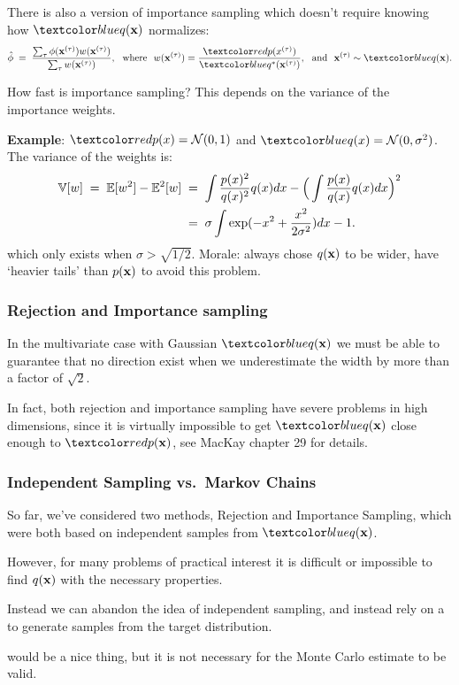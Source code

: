 \begin{frame}
There is also a version of importance sampling which doesn't require knowing
how $\Blue{q({\bfx})}$ normalizes:
\[
\hat\phi\;=\;\frac{\sum_\tau\phi(\bfx^{(\tau)})w(\bfx^{(\tau)})}{\sum_\tau w(\bfx^{(\tau)})}, \text{\ \ where\ \ }w(\bfx^{(\tau)})=\frac{\Red{p(x^{(\tau)})}}{\Blue{q^*(\bfx^{(\tau)})}}, \text{\ \ and\ \ }\bfx^{(\tau)}\sim\Blue{q(\bfx)}.
\]

How fast is importance sampling? This depends on the variance of the importance
weights.

{\bf Example}: $\Red{p(x)=\N(0,1)}$ and $\Blue{q(x)=\N(0,\sigma^2)}$. The
variance of the weights is:
\[
\begin{split}
\mathbb{V}[w]\;=\;\mathbb{E}[w^2]-\mathbb{E}^2[w]\;&=\;\int\frac{p(x)^2}{q(x)^2}q(x)dx-\Big(\int\frac{p(x)}{q(x)}q(x)dx\Big)^2\\
&=\;\sigma\int\exp(-x^2+\frac{x^2}{2\sigma^2})dx-1.
\end{split}
\]
which only exists when $\sigma>\sqrt{1/2}$. Morale: always chose $q(\mathbf x)$ to
be wider, have `heavier tails' than $p(\mathbf x)$ to avoid this problem.
\end{frame}

\begin{frame}
\frametitle{Rejection and Importance sampling}

In the multivariate case with Gaussian $\Blue{q(\bfx)}$ we must be able to
guarantee that no direction exist when we underestimate the width by more than
a factor of $\sqrt{2}$.

In fact, both rejection and importance sampling have severe problems in high
dimensions, since it is virtually impossible to get $\Blue{q(\bfx)}$ close
enough to $\Red{p(\bfx)}$, see MacKay chapter 29 for details.
\end{frame}

\begin{frame}
\frametitle{Independent Sampling vs.~Markov Chains}

So far, we've considered two methods, Rejection and Importance
Sampling, which were both based on independent samples from $\Blue{q(\bfx)}$.

However, for many problems of practical interest it is difficult or
impossible to find $q(\mathbf x)$ with the necessary properties.

Instead we can abandon the idea of independent sampling, and instead
rely on a  to generate  samples
from the target distribution.

 would be a nice thing, but it is not necessary for
the Monte Carlo estimate to be valid.
\end{frame}


